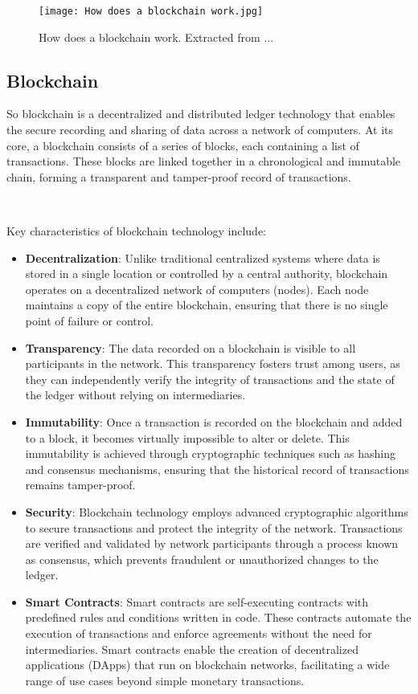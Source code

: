 \begin{figure}[H]
    \texttt{[image: How does a blockchain work.jpg]}
    \caption[How does a blockchain work]{How does a blockchain work. Extracted from ...}
    \label{fig:how_does_a_blockchain_work}
\end{figure}

\subsection{Blockchain}
\label{subsec:blockchain}

So blockchain is a decentralized and distributed ledger technology that enables the secure recording and sharing of data across a network of computers. At its core, a blockchain consists of a series of blocks, each containing a list of transactions. These blocks are linked together in a chronological and immutable chain, forming a transparent and tamper-proof record of transactions.

~

Key characteristics of blockchain technology include:
\begin{itemize}
    \item \textbf{Decentralization}: Unlike traditional centralized systems where data is stored in a single location or controlled by a central authority, blockchain operates on a decentralized network of computers (nodes). Each node maintains a copy of the entire blockchain, ensuring that there is no single point of failure or control.
    \item \textbf{Transparency}: The data recorded on a blockchain is visible to all participants in the network. This transparency fosters trust among users, as they can independently verify the integrity of transactions and the state of the ledger without relying on intermediaries.
    \item \textbf{Immutability}: Once a transaction is recorded on the blockchain and added to a block, it becomes virtually impossible to alter or delete. This immutability is achieved through cryptographic techniques such as hashing and consensus mechanisms, ensuring that the historical record of transactions remains tamper-proof.
    \item \textbf{Security}: Blockchain technology employs advanced cryptographic algorithms to secure transactions and protect the integrity of the network. Transactions are verified and validated by network participants through a process known as consensus, which prevents fraudulent or unauthorized changes to the ledger.
    \item \textbf{Smart Contracts}: Smart contracts are self-executing contracts with predefined rules and conditions written in code. These contracts automate the execution of transactions and enforce agreements without the need for intermediaries. Smart contracts enable the creation of decentralized applications (DApps) that run on blockchain networks, facilitating a wide range of use cases beyond simple monetary transactions.
\end{itemize}


